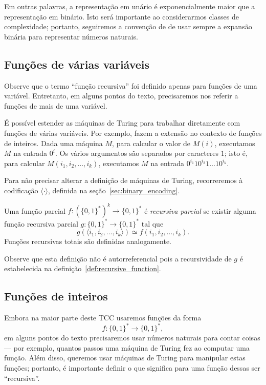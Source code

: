 Em outras palavras,
a representação em unário é exponencialmente maior que a representação em binário.
Isto será importante ao considerarmos classes de complexidade;
portanto,
seguiremos a convenção de 
de usar sempre a expansão binária para representar números naturais.

\subsection{Funções de várias variáveis}

Observe que o termo ``função recursiva''
foi definido apenas para funções de uma variável.
Entretanto,
em alguns pontos do texto,
precisaremos nos referir a funções de mais de uma variável.

É possível estender as máquinas de Turing
para trabalhar diretamente com funções de várias variáveis.
Por exemplo, 
fazem a extensão no contexto de funções de inteiros.
Dada uma máquina $M$,
para calcular o valor de $M(i)$,
executamos $M$ na entrada $0^i$.
Os vários argumentos são separados por caracteres $1$;
isto é, para calcular $M(i_1, i_2, \dots, i_k)$,
executamos $M$ na entrada $0^{i_1} 1 0^{i_2} 1 \dots 1 0^{i_k}$.

Para não precisar alterar a definição de máquinas de Turing,
recorreremos à codificação $\langle \cdot \rangle$,
definida na seção~\ref{sec:binary_encoding}.

\begin{definition}
    \label{def:multi_valued_recursive_function}
    Uma função parcial $f: (\{0, 1\}^*)^k \to \{0, 1\}^*$ é \emph{recursiva parcial}
    se existir alguma função recursiva parcial $g: \{0, 1\}^* \to \{0, 1\}^*$
    tal que
    \begin{equation*}
        g(\langle i_1, i_2, \dots, i_k \rangle) \simeq f(i_1, i_2, \dots, i_k).
    \end{equation*}
    Funções recursivas totais são definidas analogamente.
\end{definition}

Observe que esta definição não é autorreferencial
pois a recursividade de $g$ é estabelecida na definição~\ref{def:recursive_function}.

\subsection{Funções de inteiros}

Embora na maior parte deste TCC usaremos funções da forma
\begin{equation*}
    f : \{0, 1\}^* \to \{0, 1\}^*,
\end{equation*}
em alguns pontos do texto precisaremos usar números naturais para contar coisas
--- por exemplo,
quantos passos uma máquina de Turing fez ao computar uma função.
Além disso,
queremos usar máquinas de Turing para manipular estas funções;
portanto,
é importante definir o que significa para uma função dessas ser ``recursiva''.

